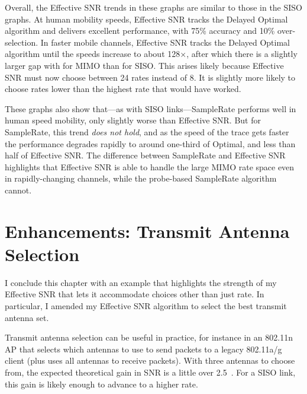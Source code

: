 Overall, the Effective SNR trends in these graphs are similar to those in the SISO graphs. At human mobility speeds, Effective SNR tracks the Delayed Optimal algorithm and delivers excellent performance, with 75\% accuracy and 10\% over-selection. In faster mobile channels, Effective SNR tracks the Delayed Optimal algorithm until the speeds increase to about 128$\times$, after which there is a slightly larger gap with for MIMO than for SISO. This arises likely because Effective SNR must now choose between 24 rates instead of 8. It is slightly more likely to choose rates lower than the highest rate that would have worked.

These graphs also show that---as with SISO links---SampleRate performs well in human speed mobility, only slightly worse than Effective SNR. But for SampleRate, this trend \emph{does not hold}, and as the speed of the trace gets faster the performance degrades rapidly to around one-third of Optimal, and less than half of Effective SNR. The difference between SampleRate and Effective SNR highlights that Effective SNR is able to handle the large MIMO rate space even in rapidly-changing channels, while the probe-based SampleRate algorithm cannot.



\section{Enhancements: Transmit Antenna Selection}
I conclude this chapter with an example that highlights the strength of my Effective SNR that lets it accommodate choices other than just rate. In particular, I amended my Effective SNR algorithm to select the best transmit antenna set.

Transmit antenna selection can be useful in practice, for instance in an 802.11n AP that selects which antennas to use to send packets to a legacy 802.11a/g client (plus uses all antennas to receive packets). With three antennas to choose from, the expected theoretical gain in SNR is a little over 2.5\dB~\cite{Goldsmith}. For a SISO link, this gain is likely enough to advance to a higher rate.

